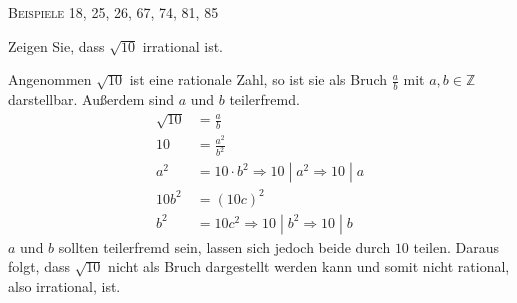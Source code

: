 \documentclass[a4paper, margins=3cm]{homework}
\begin{document}
	\begin{center}
    \textsc{Beispiele 18, 25, 26, 67, 74, 81, 85}
  \end{center}

\begin{problem}
	Zeigen Sie, dass \(\sqrt{10}\) irrational ist.
\end{problem}
\begin{solution}
	Angenommen \(\sqrt{10}\) ist eine rationale Zahl, so ist sie als Bruch \(\frac{a}{b}\) mit \(a, b \in \mathbb{Z}\) darstellbar. Außerdem sind \(a\) und \(b\) teilerfremd.
	\begin{align*}
		\sqrt{10} &= \frac{a}{b} \\
		10 &= \frac{a^2}{b^2} \\
		a^2 &= 10 \cdot b^2 \Rightarrow 10\; |\; a^2 \Rightarrow 10\; |\; a \\
		10b^2 &= (10c)^2 \\
		b^2 &= 10c^2 \Rightarrow 10\; |\; b^2 \Rightarrow 10\; |\; b
	\end{align*}
	\(a\) und \(b\) sollten teilerfremd sein, lassen sich jedoch beide durch \(10\) teilen.
	Daraus folgt, dass \(\sqrt{10}\) nicht als Bruch dargestellt werden kann und somit nicht
	rational, also irrational, ist.
\end{solution}
\end{document}
